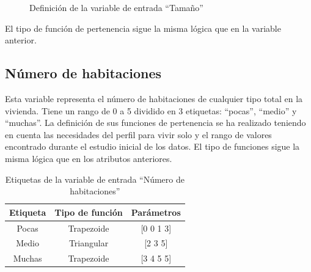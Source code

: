 \documentclass[12pt]{report} %
\begin{document}
        \begin{figure}[H]
            \centering
            \caption{Definición de la variable de entrada ``Tamaño''}
        \end{figure}

        El tipo de función de pertenencia sigue la misma lógica que en la variable anterior. 

        \subsection{Número de habitaciones}
        Esta variable representa el número de habitaciones de cualquier tipo total en la vivienda.
        Tiene un rango de 0 a 5 dividido en 3 etiquetas: ``pocas'', ``medio'' y ``muchas''.
        La definición de sus funciones de pertenencia se ha realizado teniendo en cuenta las necesidades del perfil para vivir solo
         y el rango de valores encontrado durante el estudio inicial de los datos. El tipo de funciones sigue la misma lógica
         que en los atributos anteriores.

        \begin{table}[h]
            \center
            \begin{tabular}{@{}ccc@{}}
                \toprule
                \textbf{Etiqueta} & \textbf{Tipo de función} & \textbf{Parámetros} \\
                \midrule
                Pocas  & Trapezoide & [0 0 1 3] \\
                Medio  & Triangular & [2 3 5]   \\
                Muchas & Trapezoide & [3 4 5 5] \\
                \bottomrule
            \end{tabular}
            \caption{Etiquetas de la variable de entrada ``Número de habitaciones''}
        \end{table}
\end{document}
